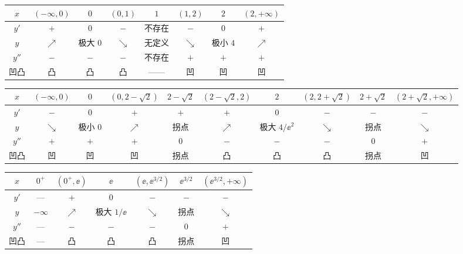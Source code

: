 
\begin{center}
\footnotesize\setlength{\tabcolsep}{1.5pt}
\begin{tabular}{@{}c|ccccccc@{}}
$x$ & $(-\infty,0)$ & $0$ & $(0,1)$ & $1$ & $(1,2)$ & $2$ & $(2,+\infty)$ \\
\hline
$y'$ & $+$ & $0$ & $-$ & 不存在 & $-$ & $0$ & $+$ \\
$y$ & $\nearrow$ & 极大 $0$ & $\searrow$ & 无定义 & $\searrow$ & 极小 $4$ & $\nearrow$ \\
$y''$ & $-$ & $-$ & $-$ & 不存在 & $+$ & $+$ & $+$ \\
凹凸 & 凸 & 凸 & 凸 & —— & 凹 & 凹 & 凹 \\
\end{tabular}
\end{center}

\begin{center}
\footnotesize\setlength{\tabcolsep}{1.5pt}
\begin{tabular}{@{}c|ccccccccc@{}}
$x$ & $(-\infty,0)$ & $0$ & $(0,2-\sqrt2)$ & $2-\sqrt2$ & $(2-\sqrt2,2)$ & $2$ & $(2,2+\sqrt2)$ & $2+\sqrt2$ & $(2+\sqrt2,+\infty)$ \\
\hline
$y'$ & $-$ & $0$ & $+$ & $+$ & $+$ & $0$ & $-$ & $-$ & $-$ \\
$y$ & $\searrow$ & 极小 $0$ & $\nearrow$ & 拐点 & $\nearrow$ & 极大 $4/\ee^2$ & $\searrow$ & 拐点 & $\searrow$ \\
$y''$ & $+$ & $+$ & $+$ & $0$ & $-$ & $-$ & $-$ & $0$ & $+$ \\
凹凸 & 凹 & 凹 & 凹 & 拐点 & 凸 & 凸 & 凸 & 拐点 & 凹 \\
\end{tabular}
\end{center}

\begin{center}
\footnotesize\setlength{\tabcolsep}{1.5pt}
\begin{tabular}{@{}c|cccccc@{}}
$x$ & $0^+$ & $(0^+,\ee)$ & $\ee$ & $(\ee,\ee^{3/2})$ & $\ee^{3/2}$ & $(\ee^{3/2},+\infty)$ \\
\hline
$y'$ & — & $+$ & $0$ & $-$ & $-$ & $-$ \\
$y$ & $-\infty$ & $\nearrow$ & 极大 $1/\ee$ & $\searrow$ & 拐点 & $\searrow$ \\
$y''$ & — & $-$ & $-$ & $-$ & $0$ & $+$ \\
凹凸 & — & 凸 & 凸 & 凸 & 拐点 & 凹 \\
\end{tabular}
\end{center}

